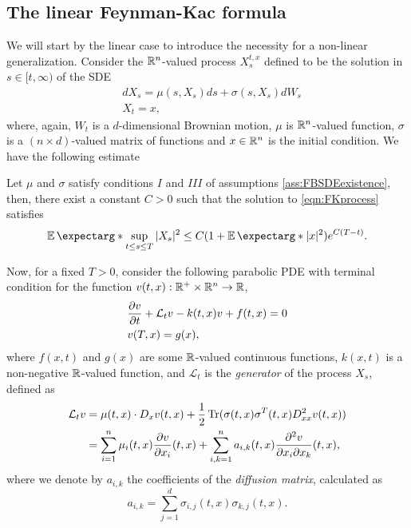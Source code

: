 \subsection{The linear Feynman-Kac formula}
We will start by the linear case to introduce the necessity for a non-linear generalization. Consider the $\mathbb{R}^n$-valued process $X_s^{t,x}$ defined to be the solution in $s\in[t,\infty)$ of the SDE 
\begin{equation}
	\label{eqn:FKprocess}
	\begin{split}
		&dX_s=\mu(s,X_s)ds+\sigma(s,X_s)dW_s\\
		&X_t=x,
	\end{split}
\end{equation}
where, again,  $W_t$ is a $d$-dimensional Brownian motion, $\mu$ is $\mathbb{R}^n$-valued function, $\sigma$ is a $(n\times d)$-valued matrix of functions and $x\in\mathbb{R}^n$ is the initial condition. We have the following estimate 
\begin{theorem}
	\label{thm:estimationSDE}
		Let $\mu$ and $\sigma$ satisfy conditions $I$ and $III$ of assumptions \ref{ass:FBSDEexistence}, then, there exist a constant $C>0$ such that the solution to \ref{eqn:FKprocess} satisfies
		\begin{equation}
			\expect*{\sup_{t\leq s\leq T}|X_s|^2}\leq C(1+\expect*{|x|^2})e^{C(T-t)}.
		\end{equation} 
\end{theorem}

Now, for a fixed $T>0$, consider the following parabolic PDE with terminal condition for the function $v(t,x):\mathbb{R}^+\times \mathbb{R}^n\to \mathbb{R}$,
\begin{equation}
	\label{eqn:FKequation}
	\begin{split}
		&\frac{\partial v}{\partial t}+\mathcal{L}_t v-k(t,x) v+f(t,x)=0\\
		&v(T,x)=g(x),
	\end{split}
\end{equation}
where $f(x,t)$ and $g(x)$ are some $\mathbb{R}$-valued continuous functions, $k(x,t)$ is a non-negative $\mathbb{R}$-valued function, and $\mathcal{L}_t$ is the \textit{generator} of the process $X_s$, defined as
\begin{equation}
	\label{eqn:ininitesimalGen}
	\begin{split}
		\mathcal{L}_tv&=\mu(t,x)\cdot D_x v(t,x)+\frac{1}{2}\operatorname{Tr}(\sigma(t,x)\sigma^{T}(t,x)D_{xx}^2v(t,x))\\
		&=\sum_{i=1}^{n}\mu_i(t,x)\frac{\partial v}{\partial x_i}(t,x)+\sum_{i,k=1}^{n}a_{i,k}(t,x)\frac{\partial^2 v}{\partial x_i\partial x_k}(t,x),
	\end{split}
\end{equation} 
where we denote by $a_{i,k}$ the coefficients of the \textit{diffusion matrix}, calculated as 
\begin{equation}
	a_{i,k}=\sum_{j=1}^{d}\sigma_{i,j}(t,x)\sigma_{k,j}(t,x).
\end{equation}

